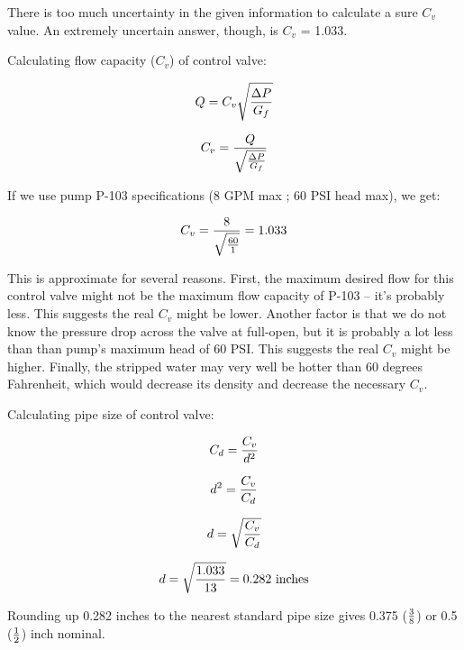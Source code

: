 





There is too much uncertainty in the given information to calculate a sure $C_v$ value.  An extremely uncertain answer, though, is $C_v$ = 1.033. 







Calculating flow capacity ($C_v$) of control valve:

$$Q = C_v \sqrt{\Delta P \over G_f}$$

$$C_v = {Q \over \sqrt{\Delta P \over G_f}}$$

If we use pump P-103 specifications (8 GPM max ; 60 PSI head max), we get:

$$C_v = {8 \over \sqrt{60 \over 1}} = 1.033$$

This is approximate for several reasons.  First, the maximum desired flow for this control valve might not be the maximum flow capacity of P-103 -- it's probably less.  This suggests the real $C_v$ might be lower.  Another factor is that we do not know the pressure drop across the valve at full-open, but it is probably a lot less than than pump's maximum head of 60 PSI.  This suggests the real $C_v$ might be higher.  Finally, the stripped water may very well be hotter than 60 degrees Fahrenheit, which would decrease its density and decrease the necessary $C_v$.

\vskip 10pt

Calculating pipe size of control valve:

$$C_d = {C_v \over d^2}$$

$$d^2 = {C_v \over C_d}$$

$$d = \sqrt{C_v \over C_d}$$

$$d = \sqrt{1.033 \over 13} = 0.282 \hbox{ inches}$$

Rounding up 0.282 inches to the nearest standard pipe size gives 0.375 ($3 \over 8$) or 0.5 ($1 \over 2$) inch nominal.




